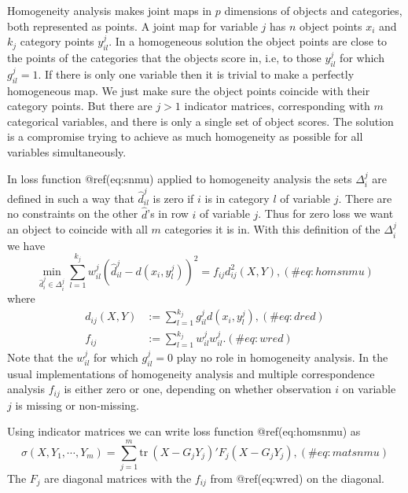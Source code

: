 \documentclass[
  12pt,
  letterpaper,
  DIV=11,
  numbers=noendperiod]{scrartcl}
\begin{document}
Homogeneity analysis makes joint maps in \(p\) dimensions of objects and
categories, both represented as points. A joint map for variable \(j\)
has \(n\) object points \(x_i\) and \(k_j\) category points
\(y^j_{il}\). In a homogeneous solution the object points are close to
the points of the categories that the objects score in, i.e, to those
\(y^j_{il}\) for which \(g^j_{il}=1\). If there is only one variable
then it is trivial to make a perfectly homogeneous map. We just make
sure the object points coincide with their category points. But there
are \(j>1\) indicator matrices, corresponding with \(m\) categorical
variables, and there is only a single set of object scores. The solution
is a compromise trying to achieve as much homogeneity as possible for
all variables simultaneously.

In loss function @ref(eq:snmu) applied to homogeneity analysis the sets
\(\Delta_i^j\) are defined in such a way that \(\hat d_{il}^j\) is zero
if \(i\) is in category \(l\) of variable \(j\). There are no
constraints on the other \(\hat d\)'s in row \(i\) of variable \(j\).
Thus for zero loss we want an object to coincide with all \(m\)
categories it is in. With this definition of the \(\Delta_i^j\) we have
\begin{equation}
\min_{\hat d_i^j\in\Delta_i^j}\sum_{l=1}^{k_j}w_{il}^j(\hat d_{il}^j-d(x_i,y_l^j))^2=f_{ij}d_{ij}^2(X,Y),
(\#eq:homsnmu)
\end{equation} where \begin{subequations}
\begin{align}
d_{ij}(X,Y)&:=\sum_{l=1}^{k_j}g_{il}^jd(x_i,y^j_l),(\#eq:dred)\\
f_{ij}&:=\sum_{l=1}^{k_j}w^j_{il}w^j_{il}.(\#eq:wred)
\end{align}
\end{subequations} Note that the \(w^j_{il}\) for which \(g^j_{il}=0\)
play no role in homogeneity analysis. In the usual implementations of
homogeneity analysis and multiple correspondence analysis \(f_{ij}\) is
either zero or one, depending on whether observation \(i\) on variable
\(j\) is missing or non-missing.

Using indicator matrices we can write loss function @ref(eq:homsnmu) as
\begin{equation}
\sigma(X,Y_1,\cdots,Y_m)=
\sum_{j=1}^m\text{tr}\ (X-G_jY_j)'F_j(X-G_jY_j),
(\#eq:matsnmu)
\end{equation} The \(F_j\) are diagonal matrices with the \(f_{ij}\)
from @ref(eq:wred) on the diagonal.
\end{document}
